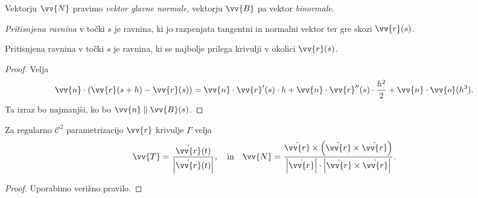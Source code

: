 \begin{opomba}
Vektorju $\vv{N}$ pravimo \emph{vektor glavne normale}, vektorju
$\vv{B}$ pa vektor \emph{binormale}.
\end{opomba}

\begin{definicija}
\emph{Pritisnjena ravnina} v
točki $s$ je ravnina, ki jo razpenjata tangentni in normalni
vektor ter gre skozi $\vv{r}(s)$.
\end{definicija}

\begin{trditev}
Pritisnjena ravnina v točki $s$ je ravnina, ki se najbolje prilega
krivulji v okolici $\vv{r}(s)$.
\end{trditev}

\begin{proof}
Velja
\[
\vv{n} \cdot (\vv{r}(s+h)-\vv{r}(s)) =
\vv{n} \cdot \vv{r}'(s) \cdot h +
\vv{n} \cdot \vv{r}''(s) \cdot \frac{h^2}{2} +
\vv{n} \cdot \vv{o}(h^3).
\]
Ta izraz bo najmanjši, ko bo $\vv{n} \parallel \vv{B}(s)$.
\end{proof}

\begin{trditev}
Za regularno $\mathcal{C}^2$ parametrizacijo $\vv{r}$ krivulje
$\Gamma$ velja
\[
\vv{T} = \frac{\dot{\vv{r}}(t)}{\abs{\dot{\vv{r}}(t)}},
\quad \text{in} \quad
\vv{N} =
\frac{\dot{\vv{r}} \times
\left(\ddot{\vv{r}} \times \dot{\vv{r}}\right)}
{\abs{\dot{\vv{r}}} \cdot
\abs{\ddot{\vv{r}} \times \dot{\vv{r}}}}.
\]
\end{trditev}

\begin{proof}
Uporabimo verižno pravilo.
\end{proof}

